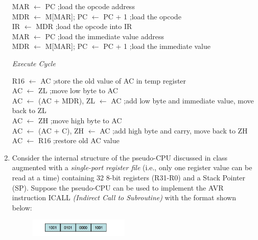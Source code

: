 \documentclass[12pt,letterpaper]{article}
\begin{document}
\begin{enumerate}
	MAR $\leftarrow$ PC 				\hfill ;load the opcode address
	\\
	MDR $\leftarrow$ M[MAR]; PC $\leftarrow$ PC + 1		\hfill ;load the opcode
	\\
	IR $\leftarrow$ MDR 				\hfill ;load the opcode into IR
	\\
	MAR $\leftarrow$ PC 				\hfill ;load the immediate value address
	\\
	MDR $\leftarrow$ M[MAR]; PC $\leftarrow$ PC + 1 \hfill ;load the immediate value
	
	\begin{center}
		\textit{Execute Cycle}
	\end{center}

	R16 $\leftarrow$ AC \hfill ;store the old value of AC in temp register
	\\
	AC $\leftarrow$ ZL \hfill ;move low byte to AC
	\\
	AC $\leftarrow$ (AC + MDR), ZL $\leftarrow$ AC \hfill ;add low byte and immediate value, move back to ZL
	\\
	AC $\leftarrow$ ZH \hfill ;move high byte to AC
	\\
	AC $\leftarrow$ (AC + C), ZH $\leftarrow$ AC \hfill ;add high byte and carry, move back to ZH
	\\
	AC $\leftarrow$ R16 \hfill ;restore old AC value






	\clearpage
   \item
   Consider the internal structure of the pseudo-CPU discussed in class augmented with a \textit{single-port register file} (i.e., only one register value can be read at a time) containing 32 8-bit registers (R31-R0) and a Stack Pointer (SP). 
   Suppose the pseudo-CPU can be used to implement the AVR instruction ICALL \textit{(Indirect Call to Subroutine)} with the format shown below: 
   
   \begin{figure}[h]
   		\centering
   		\includegraphics[width=0.45\textwidth]{Q2.png}
   \end{figure}


\end{enumerate}
\end{document}
